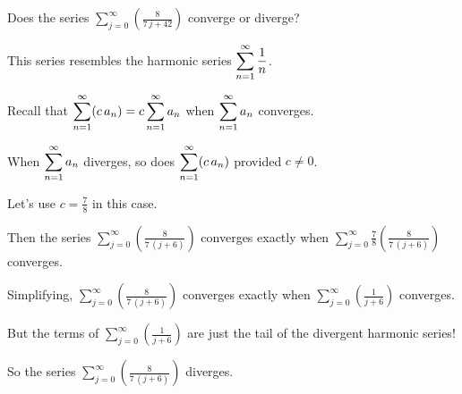 \documentclass{ximera}
\begin{document}
\begin{question}
  Does the series \(\displaystyle\sum_{j=0}^\infty \left( \displaystyle\frac{8}{7 \, j + 42} \right)\) converge or diverge?
  
  \begin{solution}
    \begin{hint}
      This series resembles the harmonic series \(\displaystyle\displaystyle\sum_{n=1}^\infty \displaystyle\displaystyle\frac{1}{n}\).
    \end{hint}
    \begin{hint}
      Recall that \(\displaystyle\displaystyle\sum_{n=1}^\infty (c \, a_n) = c \displaystyle\displaystyle\sum_{n=1}^\infty a_n\) when \(\displaystyle\displaystyle\sum_{n=1}^\infty a_n\) converges.
    \end{hint}
    \begin{hint}
      When \(\displaystyle\displaystyle\sum_{n=1}^\infty a_n\) diverges, so does \(\displaystyle\displaystyle\sum_{n=1}^\infty (c \, a_n)\) provided \(c \neq 0\).
    \end{hint}
    \begin{hint}
      Let's use \(c = \displaystyle\frac{7}{8}\) in this case.
    \end{hint}
    \begin{hint}
      Then the series \(\displaystyle\sum_{j=0}^\infty \left( \displaystyle\frac{8}{7 \, {\left(j + 6\right)}} \right)\) converges exactly when \(\displaystyle\sum_{j=0}^\infty \displaystyle\frac{7}{8} \left( \displaystyle\frac{8}{7 \, {\left(j + 6\right)}} \right)\) converges.
    \end{hint}
    \begin{hint}
      Simplifying, \(\displaystyle\sum_{j=0}^\infty \left( \displaystyle\frac{8}{7 \, {\left(j + 6\right)}} \right)\) converges exactly when \(\displaystyle\sum_{j=0}^\infty \left( \displaystyle\frac{1}{j + 6} \right)\) converges.
    \end{hint}
    \begin{hint}
      But the terms of \(\displaystyle\sum_{j=0}^\infty \left( \displaystyle\frac{1}{j + 6} \right)\) are just the tail of the divergent harmonic series!
    \end{hint}
    \begin{hint}
      So the series \(\displaystyle\sum_{j=0}^\infty \left( \displaystyle\frac{8}{7 \, {\left(j + 6\right)}} \right)\) diverges.
      
    \end{hint}
    
    \begin{multiple-choice}
      
    \end{multiple-choice}
    
  \end{solution}
\end{question}
\end{document}
